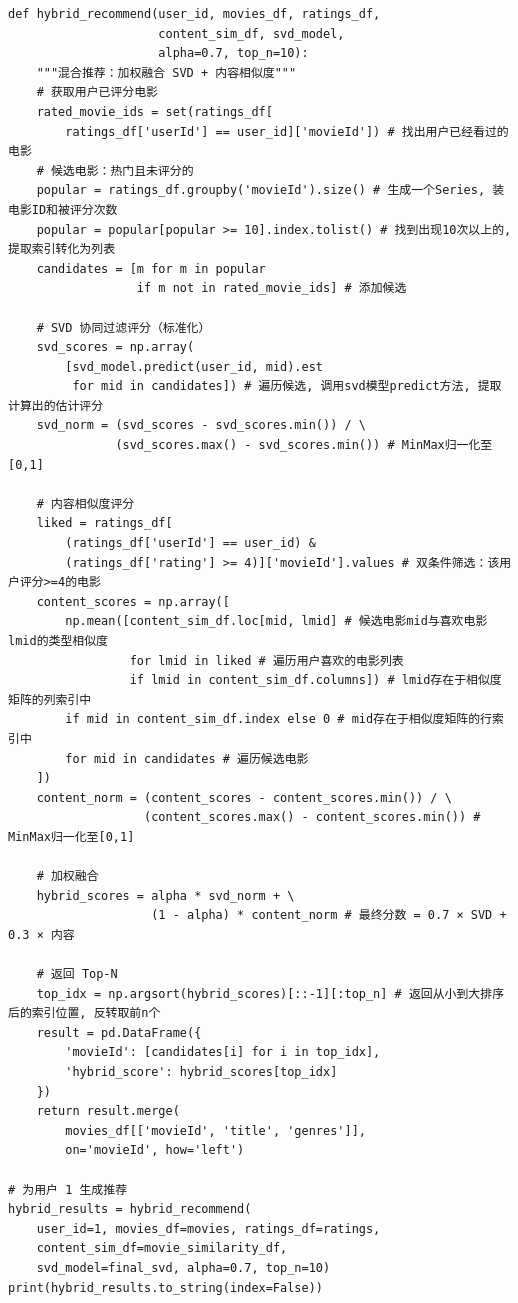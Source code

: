 \documentclass[12pt,a4paper]{ctexart}
\begin{document}
\begin{lstlisting}[caption={混合推荐与 Top-N 推荐生成}, label={lst:3-2}]
def hybrid_recommend(user_id, movies_df, ratings_df,
                     content_sim_df, svd_model,
                     alpha=0.7, top_n=10):
    """混合推荐：加权融合 SVD + 内容相似度"""
    # 获取用户已评分电影
    rated_movie_ids = set(ratings_df[
        ratings_df['userId'] == user_id]['movieId']) # 找出用户已经看过的电影
    # 候选电影：热门且未评分的
    popular = ratings_df.groupby('movieId').size() # 生成一个Series, 装电影ID和被评分次数
    popular = popular[popular >= 10].index.tolist() # 找到出现10次以上的, 提取索引转化为列表
    candidates = [m for m in popular
                  if m not in rated_movie_ids] # 添加候选
    
    # SVD 协同过滤评分（标准化）
    svd_scores = np.array(
        [svd_model.predict(user_id, mid).est
         for mid in candidates]) # 遍历候选, 调用svd模型predict方法, 提取计算出的估计评分
    svd_norm = (svd_scores - svd_scores.min()) / \
               (svd_scores.max() - svd_scores.min()) # MinMax归一化至[0,1]
    
    # 内容相似度评分
    liked = ratings_df[
        (ratings_df['userId'] == user_id) &
        (ratings_df['rating'] >= 4)]['movieId'].values # 双条件筛选：该用户评分>=4的电影
    content_scores = np.array([
        np.mean([content_sim_df.loc[mid, lmid] # 候选电影mid与喜欢电影lmid的类型相似度
                 for lmid in liked # 遍历用户喜欢的电影列表
                 if lmid in content_sim_df.columns]) # lmid存在于相似度矩阵的列索引中
        if mid in content_sim_df.index else 0 # mid存在于相似度矩阵的行索引中
        for mid in candidates # 遍历候选电影
    ])
    content_norm = (content_scores - content_scores.min()) / \
                   (content_scores.max() - content_scores.min()) # MinMax归一化至[0,1]
    
    # 加权融合
    hybrid_scores = alpha * svd_norm + \
                    (1 - alpha) * content_norm # 最终分数 = 0.7 × SVD + 0.3 × 内容
    
    # 返回 Top-N
    top_idx = np.argsort(hybrid_scores)[::-1][:top_n] # 返回从小到大排序后的索引位置, 反转取前n个
    result = pd.DataFrame({
        'movieId': [candidates[i] for i in top_idx],
        'hybrid_score': hybrid_scores[top_idx]
    })
    return result.merge(
        movies_df[['movieId', 'title', 'genres']],
        on='movieId', how='left')

# 为用户 1 生成推荐
hybrid_results = hybrid_recommend(
    user_id=1, movies_df=movies, ratings_df=ratings,
    content_sim_df=movie_similarity_df,
    svd_model=final_svd, alpha=0.7, top_n=10)
print(hybrid_results.to_string(index=False))
\end{lstlisting}
\end{document}
